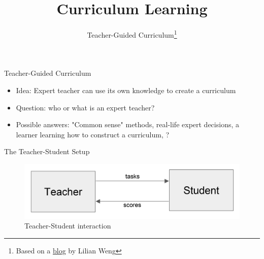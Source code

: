


\title[Curriculum RL]{Curriculum Learning}
\subtitle{Teacher-Guided Curriculum\footnote{Based on a \href{https://lilianweng.github.io/lil-log/2020/01/29/curriculum-for-reinforcement-learning.html}{blog} by Lilian Weng}}



	
	\maketitle

\begin{frame}[c]{Teacher-Guided Curriculum}
	
	\begin{itemize}
		\item Idea: Expert teacher can use its own knowledge to create a curriculum
		\item Question: who or what is an expert teacher?
		\pause
		\item Possible answers: "Common sense" methods, real-life expert decisions, a learner learning how to construct a curriculum, ?
	\end{itemize}
	
\end{frame}

\begin{frame}[c]{The Teacher-Student Setup }
	
	\begin{figure}
	\centering
	\includegraphics[scale= 0.5]{images/teacher_student.png}
	\caption{Teacher-Student interaction}
	\end{figure}
	
\end{frame}

